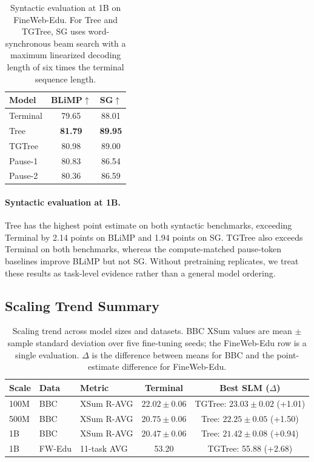 \documentclass[11pt]{article}
\begin{document}
\begin{table}[tbp]
  \centering
  \setlength{\tabcolsep}{8pt}
  \begin{tabular}{lcc}
    \toprule
    Model & BLiMP$\uparrow$ & SG$\uparrow$ \\
    \midrule
    Terminal & 79.65 & 88.01 \\
    Tree & \textbf{81.79} & \textbf{89.95} \\
    TGTree & 80.98 & 89.00 \\
    Pause-1 & 80.83 & 86.54 \\
    Pause-2 & 80.36 & 86.59 \\
    \bottomrule
  \end{tabular}
  \caption{Syntactic evaluation at 1B on FineWeb-Edu. For Tree and TGTree, SG uses word-synchronous beam search with a maximum linearized decoding length of six times the terminal sequence length.}
  \label{tab:1b-syntax}
\end{table}

\paragraph{Syntactic evaluation at 1B.}
Tree has the highest point estimate on both syntactic benchmarks, exceeding Terminal by 2.14 points on BLiMP and 1.94 points on SG. TGTree also exceeds Terminal on both benchmarks, whereas the compute-matched pause-token baselines improve BLiMP but not SG. Without pretraining replicates, we treat these results as task-level evidence rather than a general model ordering.

\subsection{Scaling Trend Summary}

\begin{table}[htbp]
  \centering
  \setlength{\tabcolsep}{12pt}
  \begin{tabular}{lllcc}
    \toprule
    Scale & Data & Metric & Terminal & Best SLM ($\Delta$) \\
    \midrule
    100M & BBC & XSum R-AVG & $22.02 \pm 0.06$ & TGTree: $23.03 \pm 0.02$ (+1.01) \\
    500M & BBC & XSum R-AVG & $20.75 \pm 0.06$ & Tree: $22.25 \pm 0.05$ (+1.50) \\
    1B & BBC & XSum R-AVG & $20.47 \pm 0.06$ & Tree: $21.42 \pm 0.08$ (+0.94) \\
    1B & FW-Edu & 11-task AVG & 53.20 & TGTree: 55.88 (+2.68) \\
    \bottomrule
  \end{tabular}
  \caption{Scaling trend across model sizes and datasets. BBC XSum values are mean $\pm$ sample standard deviation over five fine-tuning seeds; the FineWeb-Edu row is a single evaluation. $\Delta$ is the difference between means for BBC and the point-estimate difference for FineWeb-Edu.}
  \label{tab:scaling-summary}
\end{table}
\end{document}
